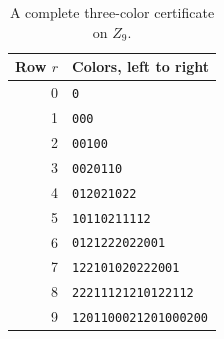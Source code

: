 \documentclass[11pt]{article}
\begin{document}
\begin{table}[ht]
\centering
\small
\begin{tabular}{r l}\toprule
Row $r$ & Colors, left to right \\\midrule
0 & \texttt{0} \\
1 & \texttt{000} \\
2 & \texttt{00100} \\
3 & \texttt{0020110} \\
4 & \texttt{012021022} \\
5 & \texttt{10110211112} \\
6 & \texttt{0121222022001} \\
7 & \texttt{122101020222001} \\
8 & \texttt{22211121210122112} \\
9 & \texttt{1201100021201000200} \\
\bottomrule\end{tabular}
\caption{A complete three-color certificate on $Z_9$.}\label{tab:n3}
\end{table}
\end{document}
